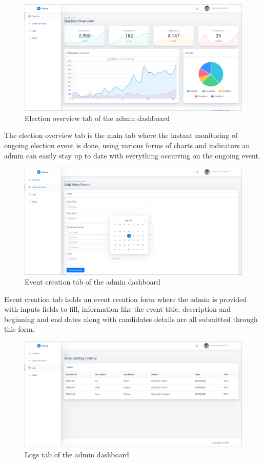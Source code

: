 \begin{figure}[H]
	\centering
		\includegraphics[width=14cm]{images/chapter3/admin_1.png}
		\caption{{\footnotesize Election overview tab of the admin dashboard}}
\end{figure}

The election overview tab is the main tab where the instant monitoring of ongoing election event is done, using various forms of charts and indicators an admin can easily stay up to date with everything occurring on the ongoing event.

\begin{figure}[H]
	\centering
		\includegraphics[width=14cm]{images/chapter3/admin_2.png}
		\caption{{\footnotesize Event creation tab of the admin dashboard}}
\end{figure}

Event creation tab holds an event creation form where the admin is provided with inputs fields to fill, information like the event title, description and beginning and end dates along with candidates details are all submitted through this form.

\begin{figure}[H]
	\centering
		\includegraphics[width=14cm]{images/chapter3/admin_3.png}
		\caption{{\footnotesize Logs tab of the admin dashboard}}
\end{figure}

